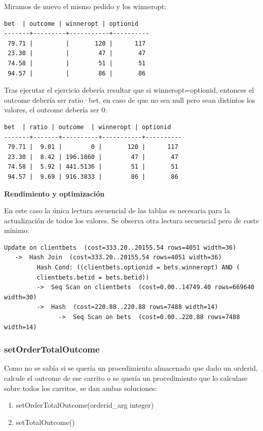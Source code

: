 \documentclass{article}
\begin{document}
Miramos de nuevo el mismo pedido y los winneropt:
\begin{lstlisting}[style=sql]
  bet  | outcome | winneropt | optionid
-------+---------+-----------+----------
 79.71 |         |       120 |      117
 23.30 |         |        47 |       47
 74.58 |         |        51 |       51
 94.57 |         |        86 |       86
 \end{lstlisting}
Tras ejecutar el ejercicio debería resultar que si winneropt=optionid, entonces el outcome debería ser ratio·bet, en caso de que no sea null pero sean distintos los valores, el outcome debería ser 0:
\begin{lstlisting}[style=sql]
  bet  | ratio | outcome  | winneropt | optionid
-------+-------+----------+-----------+----------
 79.71 |  9.01 |        0 |       120 |      117
 23.30 |  8.42 | 196.1860 |        47 |       47
 74.58 |  5.92 | 441.5136 |        51 |       51
 94.57 |  9.69 | 916.3833 |        86 |       86
 \end{lstlisting}
\bigbreak

\textbf{Rendimiento y optimización}

En este caso la única lectura secuencial de las tablas es necesaria para la actualización de todos los valores. Se observa otra lectura secuencial pero de coste mínimo:

\begin{lstlisting}[style=sql]
 Update on clientbets  (cost=333.20..20155.54 rows=4051 width=36)
   ->  Hash Join  (cost=333.20..20155.54 rows=4051 width=36)
         Hash Cond: ((clientbets.optionid = bets.winneropt) AND (
         clientbets.betid = bets.betid))
         ->  Seq Scan on clientbets  (cost=0.00..14749.40 rows=669640 width=30)
         ->  Hash  (cost=220.88..220.88 rows=7488 width=14)
               ->  Seq Scan on bets  (cost=0.00..220.88 rows=7488 width=14)
\end{lstlisting}

\subsubsection{setOrderTotalOutcome}
Como no se sabía si se quería un procedimiento almacenado que dado un orderid, calcule el outcome de ese carrito o se quería un procedimiento que lo calculase sobre todos los carritos, se dan ambas soluciones:
\begin{enumerate}
\item setOrderTotalOutcome(orderid\_arg integer)
\item setTotalOutcome()
\end{enumerate}
\end{document}
